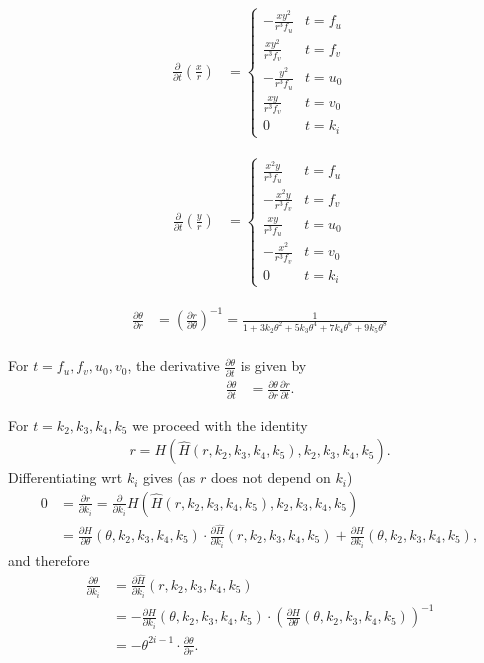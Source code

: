 \documentclass[12pt,a4paper]{amsart}
\newcommand{\dd}[1]{\frac{\partial}{\partial #1}}
\newcommand{\ddd}[2]{\frac{\partial #1}{\partial #2}}
\begin{document}
\begin{align*}
  \dd{t} \left( \frac{x}{r} \right) & =
    \begin{cases}
      -\frac{xy^2}{r^3f_u}   & t = f_u \\
       \frac{xy^2}{r^3f_v}   & t = f_v \\
      -\frac{y^2}{r^3f_u}    & t = u_0 \\
       \frac{xy}{r^3f_v}     & t = v_0 \\
      0                      & t = k_i
    \end{cases}
\end{align*}

\begin{align*}
  \dd{t} \left( \frac{y}{r} \right) & =
    \begin{cases}
       \frac{x^2y}{r^3f_u}   & t = f_u \\
      -\frac{x^2y}{r^3f_v}   & t = f_v \\
       \frac{xy}{r^3f_u}     & t = u_0 \\
      -\frac{x^2}{r^3f_v}    & t = v_0 \\
      0                      & t = k_i
    \end{cases}
\end{align*}

\begin{align*}
  \ddd{\theta}{r} &= \left( \ddd{r}{\theta} \right)^{-1} = \frac{1}{1 + 3k_2\theta^2 + 5k_3\theta^4 + 7k_4\theta^6 + 9k_5\theta^8} \\
\end{align*}

For $t = f_u, f_v, u_0, v_0$, the derivative $\ddd{\theta}{t}$ is given by
\begin{align*}
  \ddd{\theta}{t} &= \ddd{\theta}{r} \ddd{r}{t}.
\end{align*}

For $t = k_2, k_3, k_4, k_5$ we proceed with the identity
\begin{align*}
  r = H(\hat{H}(r, k_2, k_3, k_4, k_5), k_2, k_3, k_4, k_5).
\end{align*}
Differentiating wrt $k_i$ gives (as $r$ does not depend on $k_i$)
\begin{align*}
  0 &= \ddd{r}{k_i} = \dd{k_i} H(\hat{H}(r, k_2, k_3, k_4, k_5), k_2, k_3, k_4, k_5) \\
    &= \ddd{H}{\theta}(\theta, k_2, k_3, k_4, k_5)\cdot \ddd{\hat{H}}{k_i}(r, k_2, k_3, k_4, k_5) + \ddd{H}{k_i}(\theta, k_2, k_3, k_4, k_5),
\end{align*}
and therefore
\begin{align*}
  \ddd{\theta}{k_i} &= \ddd{\hat{H}}{k_i}(r, k_2, k_3, k_4, k_5) \\
                    &= - \ddd{H}{k_i}(\theta, k_2, k_3, k_4, k_5)\cdot \left( \ddd{H}{\theta}(\theta, k_2, k_3, k_4, k_5) \right)^{-1} \\
                    &= - \theta^{2i - 1}\cdot \ddd{\theta}{r}.
\end{align*}
\end{document}
